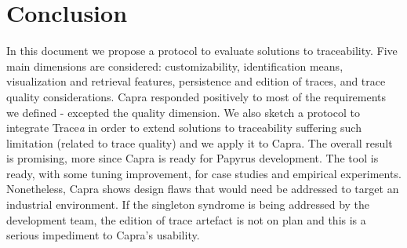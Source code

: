 \section{Conclusion}\label{sec:conclusion}

In this document we propose a protocol to evaluate solutions to traceability. Five main dimensions are considered: customizability, identification means, visualization and retrieval features, persistence and edition of traces, and trace quality considerations. Capra responded positively to most of the requirements we defined - excepted the quality dimension. 
We also sketch a protocol to integrate Trace\textit{a} in order to extend solutions to traceability suffering such limitation (related to trace quality) and we apply it to Capra. The overall result is promising, more since Capra is ready for Papyrus development. The tool is ready, with some tuning improvement, for case studies and empirical experiments.
Nonetheless, Capra shows design flaws that would need be addressed to target an industrial environment. If the singleton syndrome is being addressed by the development team, the edition of trace artefact is not on plan and this is a serious impediment to Capra's usability.


